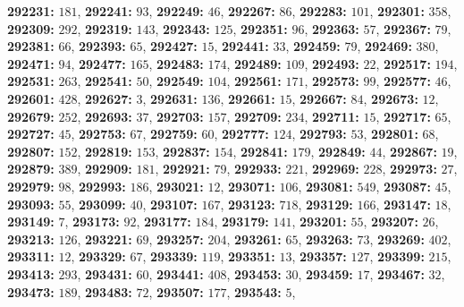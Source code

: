 \textsf{\bfseries 292231:} $181$, \textsf{\bfseries 292241:} $93$, \textsf{\bfseries 292249:} $46$, \textsf{\bfseries 292267:} $86$, \textsf{\bfseries 292283:} $101$, \textsf{\bfseries 292301:} $358$, \textsf{\bfseries 292309:} $292$, \textsf{\bfseries 292319:} $143$, \textsf{\bfseries 292343:} $125$, \textsf{\bfseries 292351:} $96$, \textsf{\bfseries 292363:} $57$, \textsf{\bfseries 292367:} $79$, \textsf{\bfseries 292381:} $66$, \textsf{\bfseries 292393:} $65$, \textsf{\bfseries 292427:} $15$, \textsf{\bfseries 292441:} $33$, \textsf{\bfseries 292459:} $79$, \textsf{\bfseries 292469:} $380$, \textsf{\bfseries 292471:} $94$, \textsf{\bfseries 292477:} $165$, \textsf{\bfseries 292483:} $174$, \textsf{\bfseries 292489:} $109$, \textsf{\bfseries 292493:} $22$, \textsf{\bfseries 292517:} $194$, \textsf{\bfseries 292531:} $263$, \textsf{\bfseries 292541:} $50$, \textsf{\bfseries 292549:} $104$, \textsf{\bfseries 292561:} $171$, \textsf{\bfseries 292573:} $99$, \textsf{\bfseries 292577:} $46$, \textsf{\bfseries 292601:} $428$, \textsf{\bfseries 292627:} $3$, \textsf{\bfseries 292631:} $136$, \textsf{\bfseries 292661:} $15$, \textsf{\bfseries 292667:} $84$, \textsf{\bfseries 292673:} $12$, \textsf{\bfseries 292679:} $252$, \textsf{\bfseries 292693:} $37$, \textsf{\bfseries 292703:} $157$, \textsf{\bfseries 292709:} $234$, \textsf{\bfseries 292711:} $15$, \textsf{\bfseries 292717:} $65$, \textsf{\bfseries 292727:} $45$, \textsf{\bfseries 292753:} $67$, \textsf{\bfseries 292759:} $60$, \textsf{\bfseries 292777:} $124$, \textsf{\bfseries 292793:} $53$, \textsf{\bfseries 292801:} $68$, \textsf{\bfseries 292807:} $152$, \textsf{\bfseries 292819:} $153$, \textsf{\bfseries 292837:} $154$, \textsf{\bfseries 292841:} $179$, \textsf{\bfseries 292849:} $44$, \textsf{\bfseries 292867:} $19$, \textsf{\bfseries 292879:} $389$, \textsf{\bfseries 292909:} $181$, \textsf{\bfseries 292921:} $79$, \textsf{\bfseries 292933:} $221$, \textsf{\bfseries 292969:} $228$, \textsf{\bfseries 292973:} $27$, \textsf{\bfseries 292979:} $98$, \textsf{\bfseries 292993:} $186$, \textsf{\bfseries 293021:} $12$, \textsf{\bfseries 293071:} $106$, \textsf{\bfseries 293081:} $549$, \textsf{\bfseries 293087:} $45$, \textsf{\bfseries 293093:} $55$, \textsf{\bfseries 293099:} $40$, \textsf{\bfseries 293107:} $167$, \textsf{\bfseries 293123:} $718$, \textsf{\bfseries 293129:} $166$, \textsf{\bfseries 293147:} $18$, \textsf{\bfseries 293149:} $7$, \textsf{\bfseries 293173:} $92$, \textsf{\bfseries 293177:} $184$, \textsf{\bfseries 293179:} $141$, \textsf{\bfseries 293201:} $55$, \textsf{\bfseries 293207:} $26$, \textsf{\bfseries 293213:} $126$, \textsf{\bfseries 293221:} $69$, \textsf{\bfseries 293257:} $204$, \textsf{\bfseries 293261:} $65$, \textsf{\bfseries 293263:} $73$, \textsf{\bfseries 293269:} $402$, \textsf{\bfseries 293311:} $12$, \textsf{\bfseries 293329:} $67$, \textsf{\bfseries 293339:} $119$, \textsf{\bfseries 293351:} $13$, \textsf{\bfseries 293357:} $127$, \textsf{\bfseries 293399:} $215$, \textsf{\bfseries 293413:} $293$, \textsf{\bfseries 293431:} $60$, \textsf{\bfseries 293441:} $408$, \textsf{\bfseries 293453:} $30$, \textsf{\bfseries 293459:} $17$, \textsf{\bfseries 293467:} $32$, \textsf{\bfseries 293473:} $189$, \textsf{\bfseries 293483:} $72$, \textsf{\bfseries 293507:} $177$, \textsf{\bfseries 293543:} $5$, 
